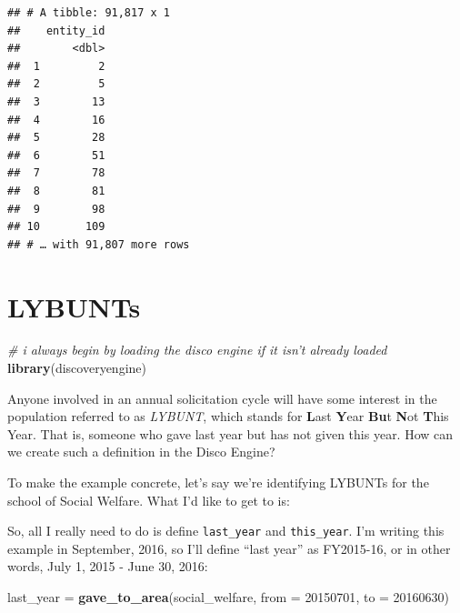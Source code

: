 \documentclass[]{book}
\newenvironment{Shaded}{\begin{snugshade}}{\end{snugshade}}
\newcommand{\CommentTok}[1]{\textcolor[rgb]{0.56,0.35,0.01}{\textit{#1}}}
\newcommand{\DataTypeTok}[1]{\textcolor[rgb]{0.13,0.29,0.53}{#1}}
\newcommand{\DecValTok}[1]{\textcolor[rgb]{0.00,0.00,0.81}{#1}}
\newcommand{\KeywordTok}[1]{\textcolor[rgb]{0.13,0.29,0.53}{\textbf{#1}}}
\newcommand{\NormalTok}[1]{#1}
\newcommand{\OperatorTok}[1]{\textcolor[rgb]{0.81,0.36,0.00}{\textbf{#1}}}
\newcommand{\StringTok}[1]{\textcolor[rgb]{0.31,0.60,0.02}{#1}}
\begin{document}
\begin{verbatim}
## # A tibble: 91,817 x 1
##    entity_id
##        <dbl>
##  1         2
##  2         5
##  3        13
##  4        16
##  5        28
##  6        51
##  7        78
##  8        81
##  9        98
## 10       109
## # … with 91,807 more rows
\end{verbatim}

\hypertarget{ex-lybunt}{%
\chapter{LYBUNTs}\label{ex-lybunt}}

\begin{Shaded}
\begin{Highlighting}[]
\CommentTok{# i always begin by loading the disco engine if it isn't already loaded}
\KeywordTok{library}\NormalTok{(discoveryengine)}
\end{Highlighting}
\end{Shaded}

Anyone involved in an annual solicitation cycle will have some interest in the population referred to as \emph{LYBUNT}, which stands for \textbf{L}ast \textbf{Y}ear \textbf{Bu}t \textbf{N}ot \textbf{T}his Year. That is, someone who gave last year but has not given this year. How can we create such a definition in the Disco Engine?

To make the example concrete, let's say we're identifying LYBUNTs for the school of Social Welfare. What I'd like to get to is:

\begin{Shaded}
\end{Shaded}

So, all I really need to do is define \texttt{last\_year} and \texttt{this\_year}. I'm writing this example in September, 2016, so I'll define ``last year'' as FY2015-16, or in other words, July 1, 2015 - June 30, 2016:

\begin{Shaded}
\begin{Highlighting}[]
\NormalTok{last_year =}\StringTok{ }\KeywordTok{gave_to_area}\NormalTok{(social_welfare, }\DataTypeTok{from =} \DecValTok{20150701}\NormalTok{, }\DataTypeTok{to =} \DecValTok{20160630}\NormalTok{)}
\end{Highlighting}
\end{Shaded}
\end{document}
